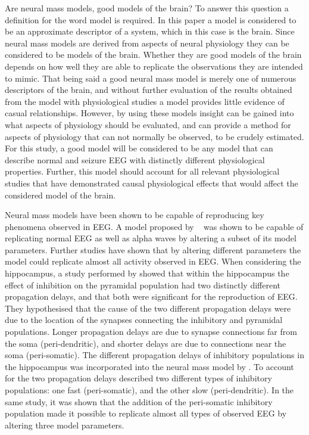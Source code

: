 Are neural mass models, good models of the brain? To answer this question a definition for the word model is required. In this paper a model is considered to be an approximate descriptor of a system, which in this case is the brain. Since neural mass models are derived from aspects of neural physiology they can be considered to be models of the brain. Whether they are good models of the brain depends on how well they are able to replicate the observations they are intended to mimic. That being said a good neural mass model is merely one of numerous descriptors of the brain, and without further evaluation of the results obtained from the model with physiological studies a model provides little evidence of casual relationships. However, by using these models insight can be gained into what aspects of physiology should be evaluated, and can provide a method for aspects of physiology that can  not normally be observed, to be crudely estimated. For this study, a good model will be considered to be any model that can describe normal and seizure EEG with distinctly different physiological properties. Further, this model should account for all relevant physiological studies that have demonstrated causal physiological effects that would affect the considered model of the brain. 

Neural mass models have been shown to be capable of reproducing key phenomena observed in EEG. A model proposed by ~\cite{jansen1995electroencephalogram} was shown to be capable of replicating normal EEG as well as alpha waves by altering a subset of its model parameters. Further studies have shown that by altering different parameters the model could replicate almost all activity observed in EEG. When considering the hippocampus, a study performed by \cite{white2000networks} showed that within the hippocampus the effect of inhibition on the pyramidal population had two distinctly different propagation delays, and that both were significant for the reproduction of EEG. They hypothesised that the cause of the two different propagation delays were due to the location of the synapses connecting the inhibitory and pyramidal populations. Longer propagation delays are due to synapse connections far from the soma (peri-dendritic), and shorter delays are due to connections near the soma (peri-somatic). The different propagation delays of inhibitory populations in the hippocampus was incorporated into the neural mass model by \cite{wendling2002epileptic}. To account for the two propagation delays \cite{wendling2002epileptic} described two different types of inhibitory populations: one fast (peri-somatic), and the other slow (peri-dendritic). In the same study, it was shown that the addition of the peri-somatic inhibitory population made it possible to replicate almost all types of observed EEG by altering three model parameters. 


